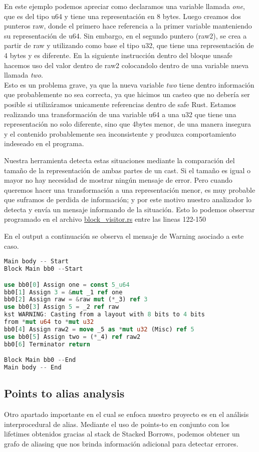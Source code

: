 En este ejemplo podemos apreciar como declaramos una variable llamada \textit{one}, que es del tipo u64 y tiene una representación en 8 bytes. Luego creamos dos punteros raw, donde el primero hace referencia a la primer variable manteniendo su representación de u64. Sin embargo, en el segundo puntero (raw2), se crea a partir de raw y utilizando como base el tipo u32, que tiene una representación de 4 bytes y es diferente. En la siguiente instrucción dentro del bloque unsafe hacemos uso del valor dentro de raw2 colocandolo dentro de una variable nueva llamada \textit{two}.\\
Esto es un problema grave, ya que la nueva variable \textit{two} tiene dentro información que probablemente no sea correcta, ya que hicimos un casteo que no debería ser posible si utilizáramos unicamente referencias dentro de safe Rust. Estamos realizando una transformación de una variable u64 a una u32 que tiene una representación no solo diferente, sino que 4bytes menor, de una manera insegura y el contenido probablemente sea inconsistente y produzca comportamiento indeseado en el programa.

Nuestra herramienta detecta estas situaciones mediante la comparación del tamaño de la representación de ambas partes de un cast. Si el tamaño es igual o mayor no hay necesidad de mostrar ningún mensaje de error. Pero cuando queremos hacer una transformación a una representación menor, es muy probable que suframos de perdida de información; y por este motivo nuestro analizador lo detecta y envía un mensaje informando de la situación. Esto lo podemos observar programado en el archivo \href{run:../src/mir_visitor/block_visitor.rs}{block\_visitor.rs} entre las lineas 122-150

En el output a continuación se observa el mensaje de Warning asociado a este caso.

\begin{lstlisting}[language=rust]
Main body -- Start
Block Main bb0 --Start

use bb0[0] Assign one = const 5_u64
bb0[1] Assign 3 = &mut _1 ref one
bb0[2] Assign raw = &raw mut (*_3) ref 3
use bb0[3] Assign 5 = _2 ref raw
kst WARNING: Casting from a layout with 8 bits to 4 bits
from *mut u64 to *mut u32
bb0[4] Assign raw2 = move _5 as *mut u32 (Misc) ref 5
use bb0[5] Assign two = (*_4) ref raw2
bb0[6] Terminator return

Block Main bb0 --End
Main body -- End
\end{lstlisting}

\subsection{Points to alias analysis}
Otro apartado importante en el cual se enfoca nuestro proyecto es en el análisis interprocedural de alias. Mediante el uso de points-to en conjunto con los lifetimes obtenidos gracias al stack de Stacked Borrows, podemos obtener un grafo de aliasing que nos brinda información adicional para detectar errores.

